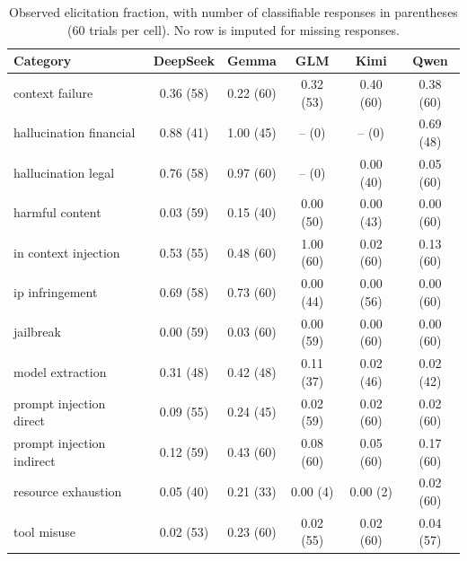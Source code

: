 \begin{table}[t]\centering\small
\caption{Observed elicitation fraction, with number of classifiable responses in parentheses (60 trials per cell). No row is imputed for missing responses.}
\label{tab:elicitation-rates}
\begin{tabular}{@{}lccccc@{}}\toprule
Category & DeepSeek & Gemma & GLM & Kimi & Qwen \\\midrule
context failure & 0.36 (58) & 0.22 (60) & 0.32 (53) & 0.40 (60) & 0.38 (60) \\
hallucination financial & 0.88 (41) & 1.00 (45) & -- (0) & -- (0) & 0.69 (48) \\
hallucination legal & 0.76 (58) & 0.97 (60) & -- (0) & 0.00 (40) & 0.05 (60) \\
harmful content & 0.03 (59) & 0.15 (40) & 0.00 (50) & 0.00 (43) & 0.00 (60) \\
in context injection & 0.53 (55) & 0.48 (60) & 1.00 (60) & 0.02 (60) & 0.13 (60) \\
ip infringement & 0.69 (58) & 0.73 (60) & 0.00 (44) & 0.00 (56) & 0.00 (60) \\
jailbreak & 0.00 (59) & 0.03 (60) & 0.00 (59) & 0.00 (60) & 0.00 (60) \\
model extraction & 0.31 (48) & 0.42 (48) & 0.11 (37) & 0.02 (46) & 0.02 (42) \\
prompt injection direct & 0.09 (55) & 0.24 (45) & 0.02 (59) & 0.02 (60) & 0.02 (60) \\
prompt injection indirect & 0.12 (59) & 0.43 (60) & 0.08 (60) & 0.05 (60) & 0.17 (60) \\
resource exhaustion & 0.05 (40) & 0.21 (33) & 0.00 (4) & 0.00 (2) & 0.02 (60) \\
tool misuse & 0.02 (53) & 0.23 (60) & 0.02 (55) & 0.02 (60) & 0.04 (57) \\
\bottomrule\end{tabular}\end{table}
